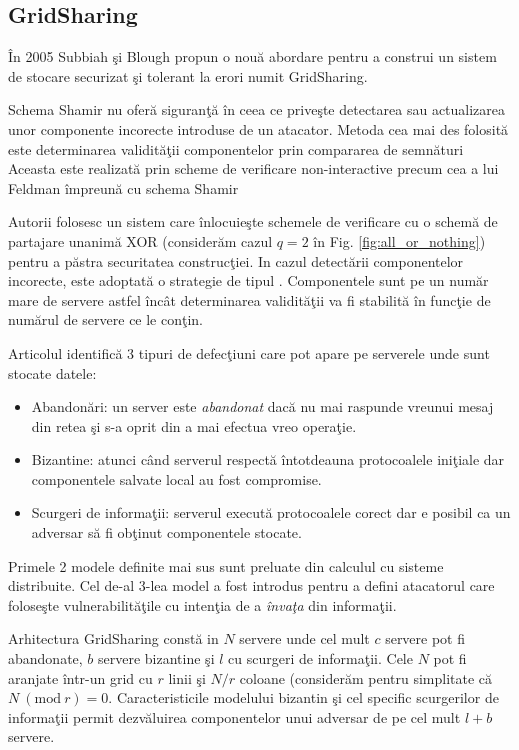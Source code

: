 \documentclass{llncs}
\newcommand{\Mod}[1]{\ (\text{mod}\ #1)}
\newcommand{\todo}[1]{{\color{red}{TODO #1}}}
\begin{document}
\subsection{GridSharing} 
\^{I}n 2005 Subbiah \c{s}i Blough propun o nou\u{a} abordare pentru a construi un sistem de stocare securizat \c{s}i tolerant la erori numit GridSharing. \cite{SB:2005}

Schema Shamir nu ofer\u{a} siguran\c{t}\u{a} \^{i}n ceea ce prive\c{s}te detectarea sau actualizarea unor componente incorecte introduse de un atacator. Metoda cea mai des folosit\u{a} este determinarea validit\u{a}\c{t}ii componentelor prin compararea de semn\u{a}turi %
Aceasta este realizat\u{a} prin scheme de verificare non-interactive precum cea a lui Feldman \^{i}mpreun\u{a} cu schema Shamir \cite{Feldman:1987}

Autorii folosesc un sistem care \^{i}nlocuie\c{s}te schemele de verificare cu o schem\u{a} de partajare unanim\u{a} XOR (consider\u{a}m cazul $q = 2$ \^{i}n Fig. \ref{fig:all_or_nothing}) pentru a p\u{a}stra securitatea construc\c{t}iei.
In cazul detect\u{a}rii componentelor incorecte, este adoptat\u{a} o strategie de tipul \todo{replicate-and-voting}.
Componentele sunt \todo{replicate} pe un num\u{a}r mare de servere astfel \^{i}nc\^{a}t determinarea validit\u{a}\c{t}ii va fi stabilit\u{a} \^{i}n func\c{t}ie de num\u{a}rul de servere ce le con\c{t}in.

Articolul identific\u{a} 3 tipuri de defec\c{t}iuni care pot apare pe serverele unde sunt stocate datele:
\begin{itemize}
	\item Abandon\u{a}ri: un server este \textit{abandonat} dac\u{a} nu mai raspunde vreunui mesaj din retea \c{s}i s-a oprit din a mai efectua vreo opera\c{t}ie.
	\item Bizantine: atunci c\^{a}nd serverul respect\u{a} \^{i}ntotdeauna protocoalele ini\c{t}iale dar componentele salvate local au fost compromise.
	\item Scurgeri de informa\c{t}ii: serverul execut\u{a} protocoalele corect dar e posibil ca un adversar s\u{a} fi ob\c{t}inut componentele stocate.
\end{itemize}
Primele 2 modele definite mai sus sunt preluate din calculul cu sisteme distribuite. Cel de-al 3-lea model a fost introdus pentru a defini atacatorul care folose\c{s}te vulnerabilit\u{a}\c{t}ile cu inten\c{t}ia de a \textit{\^{i}nva\c{t}a} din informa\c{t}ii.

Arhitectura GridSharing const\u{a} in $N$ servere unde cel mult $c$ servere pot fi abandonate, $b$ servere bizantine \c{s}i $l$ cu scurgeri de informa\c{t}ii. Cele $N$ pot fi aranjate \^{i}ntr-un grid cu $r$ linii \c{s}i $N/r$ coloane (consider\u{a}m pentru simplitate c\u{a} $N \Mod r = 0$. Caracteristicile modelului bizantin \c{s}i cel specific scurgerilor de informa\c{t}ii permit dezv\u{a}luirea componentelor unui adversar de pe cel mult $l + b$ servere.
\end{document}
